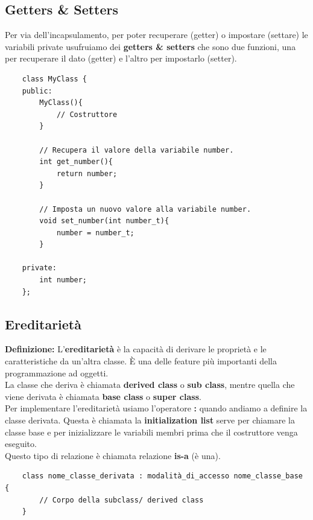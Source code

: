 \subsection{Getters \& Setters}

\textsf{\small Per via dell'incapsulamento, per poter recuperare (getter) o impostare (settare) le variabili private usufruiamo dei \textbf{getters \& setters} che sono due funzioni, una per recuperare il dato (getter) e l'altro per impostarlo (setter).} \\

\begin{lstlisting}
	class MyClass {
	public:
		MyClass(){
			// Costruttore
		}
	
		// Recupera il valore della variabile number.
		int get_number(){
			return number;
		}
		
		// Imposta un nuovo valore alla variabile number.
		void set_number(int number_t){
			number = number_t;
		}
	
	private:
		int number;
	};
\end{lstlisting}

\subsection{Ereditarietà}

\textsf{\small \textbf{Definizione: } L'\textbf{ereditarietà} è la capacità di derivare le proprietà e le caratteristiche da un'altra classe. È una delle feature più importanti della programmazione ad oggetti.} \\

\textsf{\small La classe che deriva è chiamata \textbf{derived class} o \textbf{sub class}, mentre quella che viene derivata è chiamata \textbf{base class} o \textbf{super class}.} \\

\textsf{\small Per implementare l'ereditarietà usiamo l'operatore \textbf{:} quando andiamo a definire la classe derivata. Questa è chiamata la \textbf{initialization list} serve per chiamare la classe base e per inizializzare le variabili membri prima che il costruttore venga eseguito.} \\

\textsf{\small Questo tipo di relazione è chiamata relazione \textbf{is-a} (è una).} \\

\begin{lstlisting}
	class nome_classe_derivata : modalità_di_accesso nome_classe_base {
		// Corpo della subclass/ derived class
	}
\end{lstlisting}

